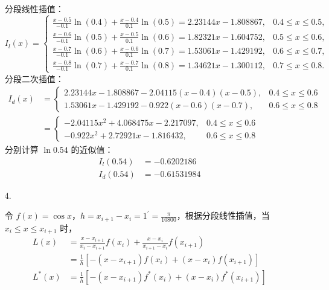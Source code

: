\documentclass{sjtuarticle}
\begin{document}
\begin{itemize}
\begin{solution}
        分段线性插值：
        \begin{equation*}
            I_l(x)=\begin{cases}
                \frac{x-0.5}{-0.1}\ln(0.4)+\frac{x-0.4}{0.1}\ln(0.5)=2.23144x-1.808867, &0.4\leq x\leq 0.5, \\
                \frac{x-0.6}{-0.1}\ln(0.5)+\frac{x-0.5}{0.1}\ln(0.6)=1.82321x-1.604752, &0.5\leq x\leq 0.6, \\
                \frac{x-0.7}{-0.1}\ln(0.6)+\frac{x-0.6}{0.1}\ln(0.7)=1.53061x-1.429192, &0.6\leq x\leq 0.7, \\
                \frac{x-0.8}{-0.1}\ln(0.7)+\frac{x-0.7}{0.1}\ln(0.8)=1.34621x-1.300112, &0.7\leq x\leq 0.8.
            \end{cases}
        \end{equation*}
        分段二次插值：
        \begin{align*}
            I_d(x)&=\begin{cases}
                2.23144x-1.808867-2.04115(x-0.4)(x-0.5), &0.4\leq x\leq 0.6 \\
                1.53061x-1.429192-0.922(x-0.6)(x-0.7), &0.6\leq x\leq 0.8
            \end{cases}\\
            &=\begin{cases}
                -2.04115x^2 + 4.068475x - 2.217097, &0.4\leq x\leq 0.6 \\
                -0.922x^2 + 2.72921x - 1.816432, &0.6\leq x\leq 0.8
            \end{cases}
        \end{align*}
        分别计算 $\ln 0.54$ 的近似值：
        \begin{align*}
            I_l(0.54)&=-0.6202186\\
            I_d(0.54)&=-0.61531984
        \end{align*}
    \end{solution}  
    \item[4.] \begin{solution} 令 $f(x)=\cos x$，$h=x_{i+1}-x_{i}=1^\prime=\frac{\pi}{10800}$，根据分段线性插值，当 $x_i\leq x\leq x_{i+1}$ 时，
        \begin{align*}
            L(x)&=\frac{x-x_{i+1}}{x_i-x_{i+1}}f(x_i)+\frac{x-x_i}{x_{i+1}-x_i}f(x_{i+1})\\
            &=\frac{1}{h}[-(x-x_{i+1})f(x_i)+(x-x_i)f(x_{i+1})]\\
            L^*(x)&=\frac{1}{h}[-(x-x_{i+1})f^*(x_i)+(x-x_i)f^*(x_{i+1})]

\end{align*}
\end{solution}
\end{itemize}
\end{document}
